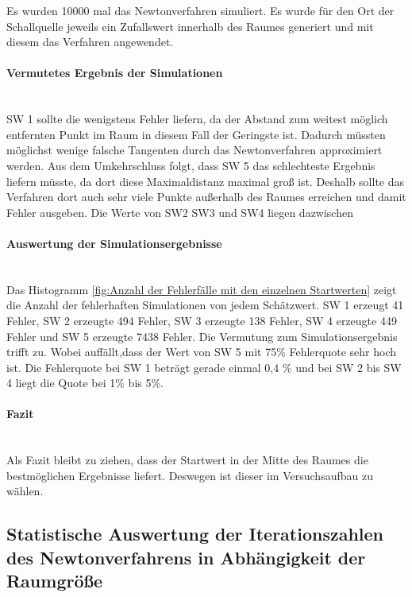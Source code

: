 Es wurden 10000 mal das Newtonverfahren simuliert. Es wurde für den Ort der Schallquelle jeweils ein Zufallswert innerhalb des Raumes generiert und mit diesem das Verfahren angewendet.
\paragraph{Vermutetes Ergebnis der Simulationen}\ \\
SW 1 sollte die wenigstens Fehler liefern, da der Abstand zum weitest möglich entfernten Punkt im Raum in diesem Fall der Geringste ist. Dadurch müssten möglichst wenige falsche Tangenten durch das Newtonverfahren approximiert werden. Aus dem Umkehrschluss folgt, dass SW 5 das schlechteste Ergebnis liefern müsste, da dort diese Maximaldistanz maximal groß ist. Deshalb sollte das Verfahren dort auch sehr viele Punkte außerhalb des Raumes erreichen und damit Fehler ausgeben.
Die Werte von SW2 SW3 und SW4 liegen dazwischen
\paragraph{Auswertung der Simulationsergebnisse}\ \\
Das Histogramm \ref{fig:Anzahl der Fehlerfälle mit den einzelnen Startwerten} zeigt die Anzahl der fehlerhaften Simulationen von jedem Schätzwert. SW 1 erzeugt 41 Fehler, SW 2 erzeugte 494 Fehler, SW 3 erzeugte 138 Fehler, SW 4 erzeugte 449 Fehler und SW 5 erzeugte 7438 Fehler.
Die Vermutung zum Simulationsergebnis trifft zu. Wobei auffällt,dass der Wert von SW 5 mit 75\% Fehlerquote sehr hoch ist.
Die Fehlerquote bei SW 1 beträgt gerade einmal 0,4 \%  und bei SW 2 bis SW 4 liegt die Quote bei 1\% bis 5\%.
 
\paragraph{Fazit}\ \\
Als Fazit bleibt zu ziehen, dass der Startwert in der Mitte des Raumes die bestmöglichen Ergebnisse liefert. Deswegen ist dieser im Versuchsaufbau zu wählen.


\subsection{Statistische Auswertung der Iterationszahlen des Newtonverfahrens in Abhängigkeit der Raumgröße}
